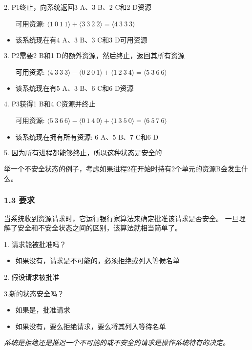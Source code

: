 2. P1终止，向系统返回3 A、3 B、2 C和2 D资源
    \begin{itemize}
        \item [可用资源: $\langle 1\ 0\ 1\ 1\rangle + \langle 3\ 3\ 2\ 2\rangle = \langle 4\ 3\ 3\ 3\rangle$]
        \item $\text{该系统现在有4 A、3 B、3 C和3 D可用资源}$
    \end{itemize}

3. P2需要2 B和1 D的额外资源，然后终止，返回其所有资源
    \begin{itemize}
        \item [可用资源: $\langle 4\ 3\ 3\ 3\rangle - \langle 0\ 2\ 0\ 1\rangle + \langle 1\ 2\ 3\ 4\rangle = \langle 5\ 3\ 6\ 6\rangle$]
        \item $\text{该系统现在有5 A、3 B、6 C和6 D资源}$
    \end{itemize}

4. P3获得1 B和4 C资源并终止
    \begin{itemize}
        \item [可用资源: $\langle 5\ 3\ 6\ 6\rangle - \langle 0\ 1\ 4\ 0\rangle + \langle 1\ 3\ 5\ 0\rangle = \langle 6\ 5\ 7\ 6\rangle$]
        \item $\text{该系统现在拥有所有资源: 6 A、5 B、7 C和6 D}$
    \end{itemize}

5. 因为所有进程都能够终止，所以这种状态是安全的

举一个不安全状态的例子，考虑如果进程2在开始时持有2个单元的资源B会发生什么。
\subsubsection{1.3 要求}
当系统收到资源请求时，它运行银行家算法来确定批准该请求是否安全。 一旦理解了安全和不安全状态之间的区别，该算法就相当简单了。

1. 请求能被批准吗？
\begin{itemize}
\item 如果没有，请求是不可能的，必须拒绝或列入等候名单
\end{itemize}

2. 假设请求被批准

3.新的状态安全吗？
\begin{itemize}
\item 如果是，批准请求
\item 如果没有，要么拒绝请求，要么将其列入等待名单
\end{itemize}

\textsl{系统是拒绝还是推迟一个不可能的或不安全的请求是操作系统特有的决定。}

